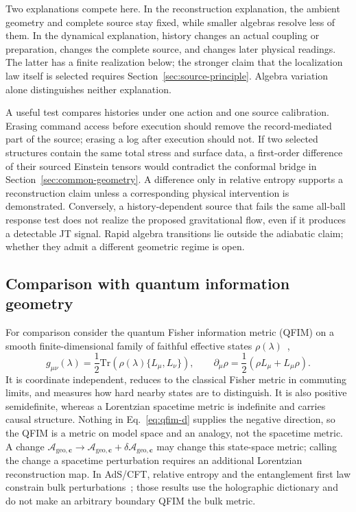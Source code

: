 Two explanations compete here. In the reconstruction explanation, the
ambient geometry and complete source stay fixed, while smaller algebras
resolve less of them. In the dynamical explanation, history changes an
actual coupling or preparation, changes the complete source, and changes
later physical readings. The latter has a finite realization below; the
stronger claim that the localization law itself is selected requires
Section~\ref{sec:source-principle}. Algebra variation alone distinguishes
neither explanation.

A useful test compares histories under one action and one source
calibration. Erasing command access before execution should remove the
record-mediated part of the source; erasing a log after execution should
not. If two selected structures contain the same total stress and surface
data, a first-order difference of their sourced Einstein tensors would
contradict the conformal bridge in Section~\ref{sec:common-geometry}.
A difference only in relative entropy supports a reconstruction claim
unless a corresponding physical intervention is demonstrated. Conversely,
a history-dependent source that fails the same all-ball response test
does not realize the proposed gravitational flow, even if it produces a
detectable JT signal. Rapid algebra transitions lie outside the adiabatic
claim; whether they admit a different geometric regime is open.

\subsection{Comparison with quantum information geometry}

For comparison consider the quantum Fisher information metric (QFIM) on a smooth finite-dimensional family of faithful effective states $\rho(\lambda)$~\cite{Petz1996,Bengtsson2006},
\begin{equation}
g_{\mu\nu}(\lambda) = \frac{1}{2} \text{Tr}\left( \rho(\lambda) \{ L_\mu, L_\nu \} \right),
\qquad
\partial_\mu \rho = \frac{1}{2}(\rho L_\mu + L_\mu \rho).
\label{eq:qfim-d}
\end{equation}
It is coordinate independent, reduces to the classical Fisher metric in commuting limits, and measures how hard nearby states are to distinguish. It is also positive semidefinite, whereas a Lorentzian spacetime metric is indefinite and carries causal structure. Nothing in Eq.~\eqref{eq:qfim-d} supplies the negative direction, so the QFIM is a metric on model space and an analogy, not the spacetime metric. A change $\mathcal{A}_{\mathrm{geo},\mathbf{c}} \to \mathcal{A}_{\mathrm{geo},\mathbf{c}} + \delta\mathcal{A}_{\mathrm{geo},\mathbf{c}}$ may change this state-space metric; calling the change a spacetime perturbation requires an additional Lorentzian reconstruction map. In AdS/CFT, relative entropy and the entanglement first law constrain bulk perturbations~\cite{Lashkari2014,Faulkner2014}; those results use the holographic dictionary and do not make an arbitrary boundary QFIM the bulk metric.


